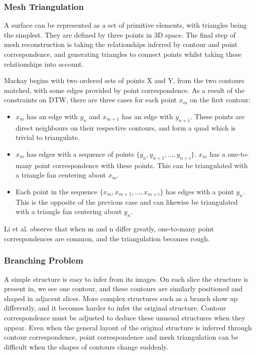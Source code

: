 \documentclass[11p, titlepage]{article}
\begin{document}
\subsubsection{Mesh Triangulation}

A surface can be represented as a set of primitive elements, with triangles being the simplest. They are defined by three points in 3D space. The final step of mesh reconstruction is taking the relationships inferred by contour and point correspondence, and generating triangles to connect points whilst taking these relationships into account.

Mackay \cite{mackay2019robust} begins with two ordered sets of points X and Y, from the two contours matched, with some edges provided by point correspondence. As a result of the constraints on DTW, there are three cases for each point $x_{m}$ on the first contour:
\begin{itemize}
\item $x_{m}$ has an edge with $y_{n}$ and $x_{m+1}$ has an edge with $y_{n+1}$. These points are direct neighbours on their respective contours, and form a quad which is trivial to triangulate.
\item $x_{m}$ has edges with a sequence of points $\{y_{n}, y_{n+1}, ..., y_{n+i}\}$. $x_{m}$ has a one-to-many point correspondence with these points. This can be triangulated with a triangle fan centering about $x_{m}$.
\item Each point in the sequence $\{x_{m}, x_{m+1}, ..., x_{m+i}\}$ has edges with a point $y_{n}$. This is the opposite of the previous case and can likewise be triangulated with a triangle fan centering about $y_{n}$.
\end{itemize}
Li et al. \cite{li2021method} observe that when m and n differ greatly, one-to-many point correspondences are common, and the triangulation becomes rough.

\subsubsection{Branching Problem}

A simple structure is easy to infer from its images. On each slice the structure is present in, we see one contour, and these contours are similarly positioned and shaped in adjacent slices. More complex structures such as a branch show up differently, and it becomes harder to infer the original structure. Contour correspondence must be adjusted to deduce these unusual structures when they appear. Even when the general layout of the original structure is inferred through contour correspondence, point correspondence and mesh triangulation can be difficult when the shapes of contours change suddenly.
\end{document}
